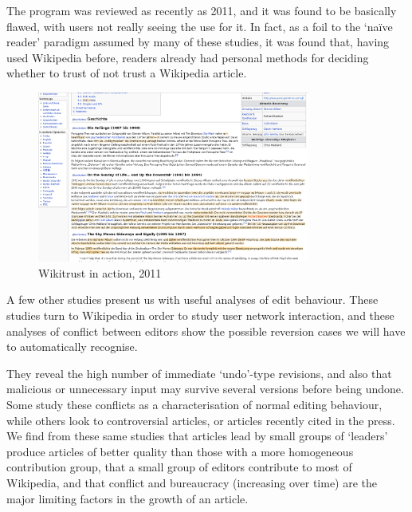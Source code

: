 The program was reviewed as recently as 2011,\cite{Lucassen2011} and
it was found to be basically flawed, with users not really seeing the
use for it. In fact, as a foil to the `na\"ive reader' paradigm
assumed by many of these studies, it was found that, having used
Wikipedia before, readers already had personal methods for deciding
whether to trust of not trust a Wikipedia article. 

\begin{figure}
  \centering
  \includegraphics[width=0.8\textwidth,clip=true,resolution=300]{img/wikitrust.png}
  \caption{Wikitrust in action, 2011}
  \label{fig:wikitrust}
\end{figure}

A few other studies present us with useful analyses of edit
behaviour. These studies turn to Wikipedia in order to study user
network interaction, and these analyses of conflict between editors
show the possible reversion cases we will have to automatically
recognise. 

They reveal the high number of immediate `undo'-type revisions, and
also that malicious or unnecessary input may survive several versions
before being undone. Some study these conflicts as a characterisation
of normal editing
behaviour,\cite{Kittur2007}\cite{Kittur2009}\cite{Kittur2010}\cite{Potthast2008}
while others look to controversial articles,\cite{Iba2010} or articles
recently cited in the press.\cite{Lih2004} We find from these same
studies that articles lead by small groups of `leaders' produce
articles of better quality than those with a more homogeneous
contribution group, that a small group of editors contribute to most
of Wikipedia, and that conflict and bureaucracy (increasing over time)
are the major limiting factors in the growth of an
article.\cite{Suh2009} 
